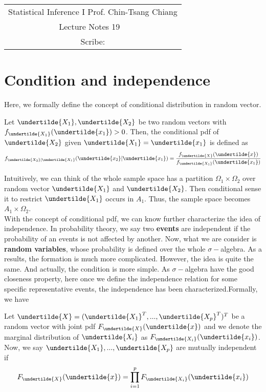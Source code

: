 \documentclass[../MultivariateProbabilityAndRelatedProperties.tex]{subfiles}
\begin{document}
	\begin{center}
		\renewcommand{\arraystretch}{2}
		\begin{bfseries}
			\begin{tabular}{|c|}
				\hline
				Statistical Inference I \hfill Prof. Chin-Tsang Chiang\\
				\hspace{15em} {\large Lecture Notes 19} \hspace{15em}\ \\
				\lecdate \hfill Scribe: \scribe\\
				\hline
			\end{tabular}
			\renewcommand{\arraystretch}{1}
		\end{bfseries}
	\end{center}

\section{Condition and independence}

Here, we formally define the concept of conditional distribution in random vector.
\begin{definition}
	Let $\undertilde{X_1},\undertilde{X_2}$ be two random vectors with $f_{\undertilde{X_1}}(\undertilde{x_1})>0$. Then, the conditional pdf of $\undertilde{X_2}$ given $\undertilde{X_1}=\undertilde{x_1}$ is defined as
	$$f_{\undertilde{X_2}|\undertilde{X_1}}(\undertilde{x_2}|\undertilde{x_1}) = \frac{f_{\undertilde{X}}(\undertilde{x})}{f_{\undertilde{X_1}}(\undertilde{x_1})}$$
\end{definition}
Intuitively, we can think of the whole sample space has a partition $\Omega_1\times\Omega_2$ over random vector $\undertilde{X_1}$ and $\undertilde{X_2}$. Then conditional sense it to restrict $\undertilde{X_1}$ occurs in $A_1$. Thus, the sample space becomes $A_1\times\Omega_2$.\\

With the concept of conditional pdf, we can know further characterize the idea of independence. In probability theory, we say two {\bf events} are independent if the probability of an events is not affected by another. Now, what we are consider is {\bf random variables}, whose probability is defined over the whole $\sigma-$algebra. As a results, the formation is much more complicated. However, the idea is quite the same. And actually, the condition is more simple. As $\sigma-$algebra have the good closeness property, here once we define the independence relation for some specific representative events, the independence has been characterized.Formally, we have
\begin{definition}[independence]
	Let $\undertilde{X} = (\undertilde{X_1}^T,...,\undertilde{X_p}^T)^T$ be a random vector with joint pdf $F_{\undertilde{X}}(\undertilde{x})$ and we denote the marginal distribution of $\undertilde{X_i}$ as $F_{\undertilde{X_i}}(\undertilde{x_i})$. Now, we say $\undertilde{X_1},...,\undertilde{X_p}$ are mutually independent if 
	$$F_{\undertilde{X}}(\undertilde{x}) = \prod_{i=1}^p F_{\undertilde{X_i}}(\undertilde{x_i})$$
\end{definition}
\end{document}
